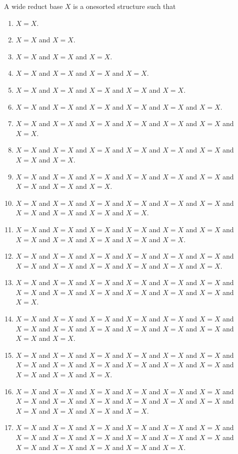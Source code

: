 \begin{struct}\label{reduct_wide}
    A wide reduct base $X$ is a onesorted structure such that
    \begin{enumerate}
        \item\label{reduct_wide_law1} $X=X$.
        \item\label{reduct_wide_law2} $X=X$ and $X=X$.
        \item\label{reduct_wide_law3} $X=X$ and $X=X$ and $X=X$.
        \item\label{reduct_wide_law4} $X=X$ and $X=X$ and $X=X$ and $X=X$.
        \item\label{reduct_wide_law5} $X=X$ and $X=X$ and $X=X$ and $X=X$ and $X=X$.
        \item\label{reduct_wide_law6} $X=X$ and $X=X$ and $X=X$ and $X=X$ and $X=X$ and $X=X$.
        \item\label{reduct_wide_law7} $X=X$ and $X=X$ and $X=X$ and $X=X$ and $X=X$ and $X=X$ and $X=X$.
        \item\label{reduct_wide_law8} $X=X$ and $X=X$ and $X=X$ and $X=X$ and $X=X$ and $X=X$ and $X=X$ and $X=X$.
        \item\label{reduct_wide_law9} $X=X$ and $X=X$ and $X=X$ and $X=X$ and $X=X$ and $X=X$ and $X=X$ and $X=X$ and $X=X$.
        \item\label{reduct_wide_law10} $X=X$ and $X=X$ and $X=X$ and $X=X$ and $X=X$ and $X=X$ and $X=X$ and $X=X$ and $X=X$ and $X=X$.
        \item\label{reduct_wide_law11} $X=X$ and $X=X$ and $X=X$ and $X=X$ and $X=X$ and $X=X$ and $X=X$ and $X=X$ and $X=X$ and $X=X$ and $X=X$.
        \item\label{reduct_wide_law12} $X=X$ and $X=X$ and $X=X$ and $X=X$ and $X=X$ and $X=X$ and $X=X$ and $X=X$ and $X=X$ and $X=X$ and $X=X$ and $X=X$.
        \item\label{reduct_wide_law13} $X=X$ and $X=X$ and $X=X$ and $X=X$ and $X=X$ and $X=X$ and $X=X$ and $X=X$ and $X=X$ and $X=X$ and $X=X$ and $X=X$ and $X=X$.
        \item\label{reduct_wide_law14} $X=X$ and $X=X$ and $X=X$ and $X=X$ and $X=X$ and $X=X$ and $X=X$ and $X=X$ and $X=X$ and $X=X$ and $X=X$ and $X=X$ and $X=X$ and $X=X$.
        \item\label{reduct_wide_law15} $X=X$ and $X=X$ and $X=X$ and $X=X$ and $X=X$ and $X=X$ and $X=X$ and $X=X$ and $X=X$ and $X=X$ and $X=X$ and $X=X$ and $X=X$ and $X=X$ and $X=X$.
        \item\label{reduct_wide_law16} $X=X$ and $X=X$ and $X=X$ and $X=X$ and $X=X$ and $X=X$ and $X=X$ and $X=X$ and $X=X$ and $X=X$ and $X=X$ and $X=X$ and $X=X$ and $X=X$ and $X=X$ and $X=X$.
        \item\label{reduct_wide_law17} $X=X$ and $X=X$ and $X=X$ and $X=X$ and $X=X$ and $X=X$ and $X=X$ and $X=X$ and $X=X$ and $X=X$ and $X=X$ and $X=X$ and $X=X$ and $X=X$ and $X=X$ and $X=X$ and $X=X$.
    \end{enumerate}
\end{struct}

